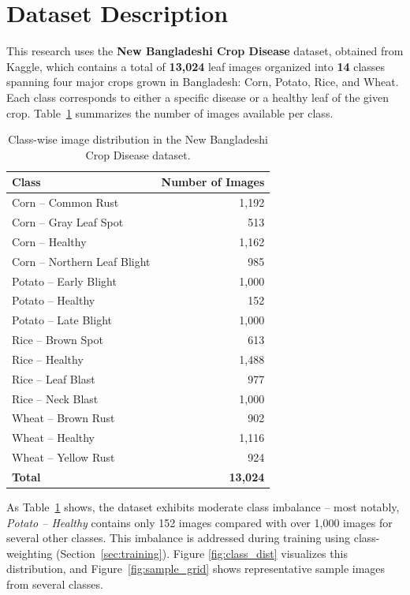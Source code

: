 \documentclass[12pt,a4paper,oneside]{report}
\begin{document}
\section{Dataset Description}
This research uses the \textbf{New Bangladeshi Crop Disease} dataset, obtained from Kaggle, which contains a
total of \textbf{13,024} leaf images organized into \textbf{14} classes spanning four major crops grown in
Bangladesh: Corn, Potato, Rice, and Wheat. Each class corresponds to either a specific disease or a healthy leaf
of the given crop. Table~\ref{tab:class_distribution} summarizes the number of images available per class.

\begin{table}[H]
\centering
\caption{Class-wise image distribution in the New Bangladeshi Crop Disease dataset.}
\label{tab:class_distribution}
\begin{tabular}{lr}
\toprule
\textbf{Class} & \textbf{Number of Images} \\
\midrule
Corn -- Common Rust & 1{,}192 \\
Corn -- Gray Leaf Spot & 513 \\
Corn -- Healthy & 1{,}162 \\
Corn -- Northern Leaf Blight & 985 \\
Potato -- Early Blight & 1{,}000 \\
Potato -- Healthy & 152 \\
Potato -- Late Blight & 1{,}000 \\
Rice -- Brown Spot & 613 \\
Rice -- Healthy & 1{,}488 \\
Rice -- Leaf Blast & 977 \\
Rice -- Neck Blast & 1{,}000 \\
Wheat -- Brown Rust & 902 \\
Wheat -- Healthy & 1{,}116 \\
Wheat -- Yellow Rust & 924 \\
\midrule
\textbf{Total} & \textbf{13{,}024} \\
\bottomrule
\end{tabular}
\end{table}

As Table~\ref{tab:class_distribution} shows, the dataset exhibits moderate class imbalance -- most notably,
\textit{Potato -- Healthy} contains only 152 images compared with over 1,000 images for several other classes.
This imbalance is addressed during training using class-weighting (Section~\ref{sec:training}). Figure
\ref{fig:class_dist} visualizes this distribution, and Figure~\ref{fig:sample_grid} shows representative sample
images from several classes.
\end{document}
